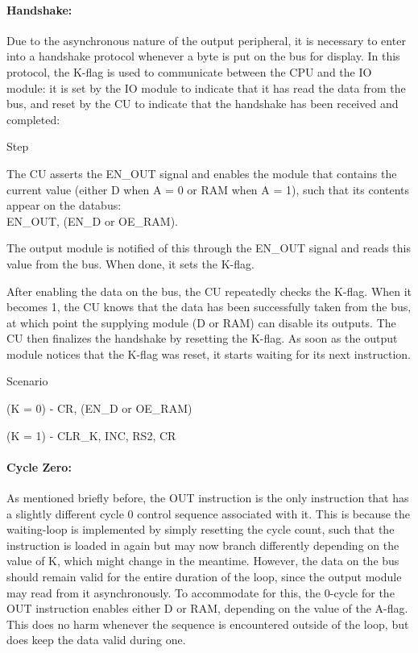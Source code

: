 \paragraph{Handshake:} Due to the asynchronous nature of the output peripheral, it is necessary to enter into a handshake protocol whenever a byte is put on the bus for display. In this protocol, the K-flag is used to communicate between the CPU and the IO module: it is set by the IO module to indicate that it has read the data from the bus, and reset by the CU to indicate that the handshake has been received and completed:

\begin{labeledenum}{Step}
\item The CU asserts the EN\_OUT signal and enables the module that contains the current value (either D when A = 0 or RAM when A = 1), such that its contents appear on the databus:\\EN\_OUT, (EN\_D or OE\_RAM).
\item The output module is notified of this through the EN\_OUT signal and reads this value from the bus. When done, it sets the K-flag.
\item After enabling the data on the bus, the CU repeatedly checks the K-flag. When it becomes 1, the CU knows that the data has been successfully taken from the bus, at which point the supplying module (D or RAM) can disable its outputs. The CU then finalizes the handshake by resetting the K-flag. As soon as the output module notices that the K-flag was reset, it starts waiting for its next instruction.
  
  \begin{labeledenum}{Scenario}
  \item (K = 0) - CR, (EN\_D or OE\_RAM)
  \item (K = 1) - CLR\_K, INC, RS2, CR   
  \end{labeledenum}
\end{labeledenum}


\paragraph{Cycle Zero:} As mentioned briefly before, the OUT instruction is the only instruction that has a slightly different cycle 0 control sequence associated with it. This is because the waiting-loop is implemented by simply resetting the cycle count, such that the instruction is loaded in again but may now branch differently depending on the value of K, which might change in the meantime. However, the data on the bus should remain valid for the entire duration of the loop, since the output module may read from it asynchronously. To accommodate for this, the 0-cycle for the OUT instruction enables either D or RAM, depending on the value of the A-flag. This does no harm whenever the sequence is encountered outside of the loop, but does keep the data valid during one. 

